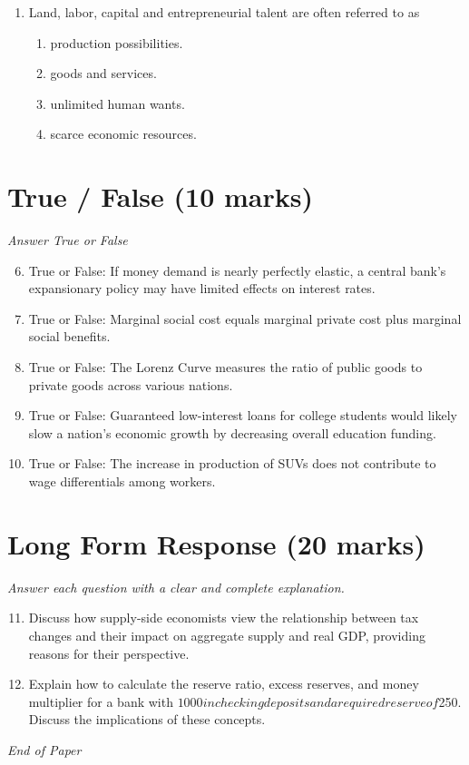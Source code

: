 \documentclass[12pt]{article}
\begin{document}
\begin{enumerate}[label=\arabic*.]
\begin{enumerate}[label=(\alph*)]
    \item More rapid consumption of natural resources.
    \item Higher adult illiteracy rates.
    \item A falling stock of capital goods.
    \item Investment tax credits.
\end{enumerate}
\item Land, labor, capital and entrepreneurial talent are often referred to as
\begin{enumerate}[label=(\alph*)]
    \item production possibilities.
    \item goods and services.
    \item unlimited human wants.
    \item scarce economic resources.
\end{enumerate}
\end{enumerate}

\section*{True / False (10 marks)}
\textit{Answer True or False}
\begin{enumerate}[label=\arabic*.]
\setcounter{enumi}{5}
\item True or False: If money demand is nearly perfectly elastic, a central bank's expansionary policy may have limited effects on interest rates.
\item True or False: Marginal social cost equals marginal private cost plus marginal social benefits.
\item True or False: The Lorenz Curve measures the ratio of public goods to private goods across various nations.
\item True or False: Guaranteed low-interest loans for college students would likely slow a nation's economic growth by decreasing overall education funding.
\item True or False: The increase in production of SUVs does not contribute to wage differentials among workers.
\end{enumerate}

\section*{Long Form Response (20 marks)}
\textit{Answer each question with a clear and complete explanation.}
\begin{enumerate}[label=\arabic*.]
\setcounter{enumi}{10}
\item Discuss how supply-side economists view the relationship between tax changes and their impact on aggregate supply and real GDP, providing reasons for their perspective.
\item Explain how to calculate the reserve ratio, excess reserves, and money multiplier for a bank with $1000 in checking deposits and a required reserve of $250. Discuss the implications of these concepts.
\end{enumerate}

\vfill
\noindent\textit{End of Paper}
\end{document}
